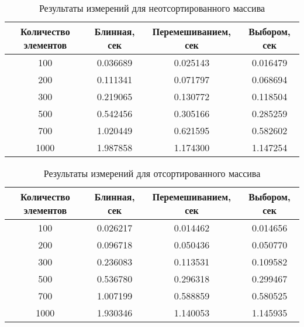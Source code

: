 \begin{table}[H]
	\begin{center}
		\captionsetup{justification=raggedright,singlelinecheck=off}
		\caption{\label{tnsort}Результаты измерений для неотсортированного массива}
		\begin{tabular}{|c|c|c|c|}
			\hline
			Количество элементов & Блинная, сек & Перемешиванием, сек & Выбором, сек \\
			\hline
			100 & 0.036689 & 0.025143 & 0.016479 \\
			\hline
			200 & 0.111341 & 0.071797 & 0.068694 \\
			\hline
			300 & 0.219065 & 0.130772 & 0.118504 \\
			\hline
			500 & 0.542456 & 0.305166 & 0.285259 \\
			\hline
			700 & 1.020449 & 0.621595 & 0.582602 \\
			\hline
			1000 & 1.987858 & 1.174300 & 1.147254 \\
			\hline
		\end{tabular}
	\end{center}
\end{table}
\begin{table}[H]
	\begin{center}
		\captionsetup{justification=raggedright,singlelinecheck=off}
		\caption{\label{tsort}Результаты измерений для отсортированного массива}
		\begin{tabular}{|c|c|c|c|}
			\hline
			Количество элементов & Блинная, сек & Перемешиванием, сек & Выбором, сек \\
			\hline
			100 & 0.026217 & 0.014462 & 0.014656 \\
			\hline
			200 & 0.096718 & 0.050436 & 0.050770 \\
			\hline
			300 & 0.236083 & 0.113531 & 0.109582 \\
			\hline
			500 & 0.536780 & 0.296318 & 0.299467 \\
			\hline
			700 & 1.007199 & 0.588859 & 0.580525 \\
			\hline
			1000 & 1.930346 & 1.140053 & 1.145935 \\
			\hline
		\end{tabular}
	\end{center}
\end{table}
